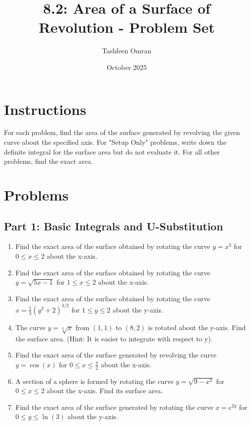 \documentclass[12pt]{article}
\begin{document}
\title{8.2: Area of a Surface of Revolution - Problem Set}
\author{Tashfeen Omran}
\date{October 2025}
\maketitle

\section*{Instructions}
For each problem, find the area of the surface generated by revolving the given curve about the specified axis. For "Setup Only" problems, write down the definite integral for the surface area but do not evaluate it. For all other problems, find the exact area.

\section*{Problems}

\subsection*{Part 1: Basic Integrals and U-Substitution}

\begin{enumerate}
    \item Find the exact area of the surface obtained by rotating the curve $y = x^3$ for $0 \le x \le 2$ about the x-axis.

    \item Find the exact area of the surface obtained by rotating the curve $y = \sqrt{5x-1}$ for $1 \le x \le 2$ about the x-axis.

    \item Find the exact area of the surface obtained by rotating the curve $x = \frac{1}{3}(y^2 + 2)^{3/2}$ for $1 \le y \le 2$ about the y-axis.

    \item The curve $y = \sqrt[3]{x}$ from $(1, 1)$ to $(8, 2)$ is rotated about the y-axis. Find the surface area. (Hint: It is easier to integrate with respect to y).

    \item Find the exact area of the surface generated by revolving the curve $y = \cos(x)$ for $0 \le x \le \frac{\pi}{2}$ about the x-axis.

    \item A section of a sphere is formed by rotating the curve $y = \sqrt{9-x^2}$ for $0 \le x \le 2$ about the x-axis. Find its surface area.

    \item Find the exact area of the surface generated by rotating the curve $x=e^{2y}$ for $0 \le y \le \ln(3)$ about the y-axis.
\end{enumerate}
\end{document}

